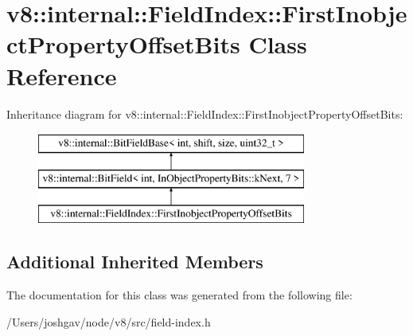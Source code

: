 \hypertarget{classv8_1_1internal_1_1_field_index_1_1_first_inobject_property_offset_bits}{}\section{v8\+:\+:internal\+:\+:Field\+Index\+:\+:First\+Inobject\+Property\+Offset\+Bits Class Reference}
\label{classv8_1_1internal_1_1_field_index_1_1_first_inobject_property_offset_bits}
Inheritance diagram for v8\+:\+:internal\+:\+:Field\+Index\+:\+:First\+Inobject\+Property\+Offset\+Bits\+:\begin{figure}[H]
\begin{center}
\leavevmode
\includegraphics[height=3.000000cm]{classv8_1_1internal_1_1_field_index_1_1_first_inobject_property_offset_bits}
\end{center}
\end{figure}
\subsection*{Additional Inherited Members}


The documentation for this class was generated from the following file\+:\begin{DoxyCompactItemize}
\item 
/\+Users/joshgav/node/v8/src/field-\/index.\+h\end{DoxyCompactItemize}
